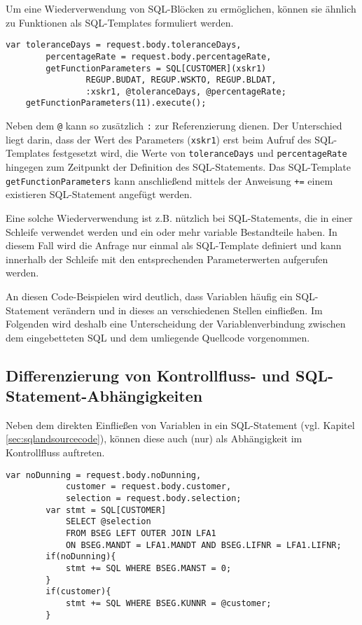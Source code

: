 Um eine Wiederverwendung von SQL-Blöcken zu ermöglichen, können sie ähnlich zu Funktionen als SQL-Templates \cite{Horschig2014} formuliert werden.

	\begin{lstlisting}[caption={SQL-Templates ermöglichen Wiederverwendung}, label={lst:sqlfunctions}, language=JavaScriptSQL]
	var toleranceDays = request.body.toleranceDays,
	    percentageRate = request.body.percentageRate,
	    getFunctionParameters = SQL[CUSTOMER](xskr1)
				REGUP.BUDAT, REGUP.WSKTO, REGUP.BLDAT,
				:xskr1, @toleranceDays, @percentageRate;
	getFunctionParameters(11).execute();
	\end{lstlisting}

Neben dem \texttt{@} kann so zusätzlich \texttt{:} zur Referenzierung dienen.
Der Unterschied liegt darin, dass der Wert des Parameters (\texttt{xskr1}) erst beim Aufruf des SQL-Templates festgesetzt wird, die Werte von \texttt{toleranceDays} und \texttt{percentageRate} hingegen zum Zeitpunkt der Definition des SQL-Statements.
Das SQL-Template \texttt{getFunctionParameters} kann anschließend mittels der Anweisung \texttt{+=} einem existieren SQL-Statement angefügt werden.

Eine solche Wiederverwendung ist z.B. nützlich bei SQL-Statements, die in einer Schleife verwendet werden und ein oder mehr variable Bestandteile haben.
In diesem Fall wird die Anfrage nur einmal als SQL-Template definiert und kann innerhalb der Schleife mit den entsprechenden Parameterwerten aufgerufen werden.

An diesen Code-Beispielen wird deutlich, dass Variablen häufig ein SQL-Statement verändern und in dieses an verschiedenen Stellen einfließen.
Im Folgenden wird deshalb eine Unterscheidung der Variablenverbindung zwischen dem eingebetteten SQL und dem umliegende Quellcode vorgenommen.

\subsection{Differenzierung von Kontrollfluss- und SQL-Statement-Abhängigkeiten}\label{sec:controlflowandsqldependencies}
Neben dem direkten Einfließen von Variablen in ein SQL-Statement (vgl. Kapitel \ref{sec:sqlandsourcecode}), können diese auch (nur) als Abhängigkeit im Kontrollfluss auftreten.

	\begin{lstlisting}[caption={Verschiedene Arten der Abhängigkeit von Variablen}, label={lst:differentdep}, language=JavaScriptSQL]
		var noDunning = request.body.noDunning,
		    customer = request.body.customer,
		    selection = request.body.selection;
		var stmt = SQL[CUSTOMER]
			SELECT @selection
			FROM BSEG LEFT OUTER JOIN LFA1
			ON BSEG.MANDT = LFA1.MANDT AND BSEG.LIFNR = LFA1.LIFNR;
		if(noDunning){
			stmt += SQL WHERE BSEG.MANST = 0;
		}
		if(customer){
			stmt += SQL WHERE BSEG.KUNNR = @customer;
		}
	\end{lstlisting}


